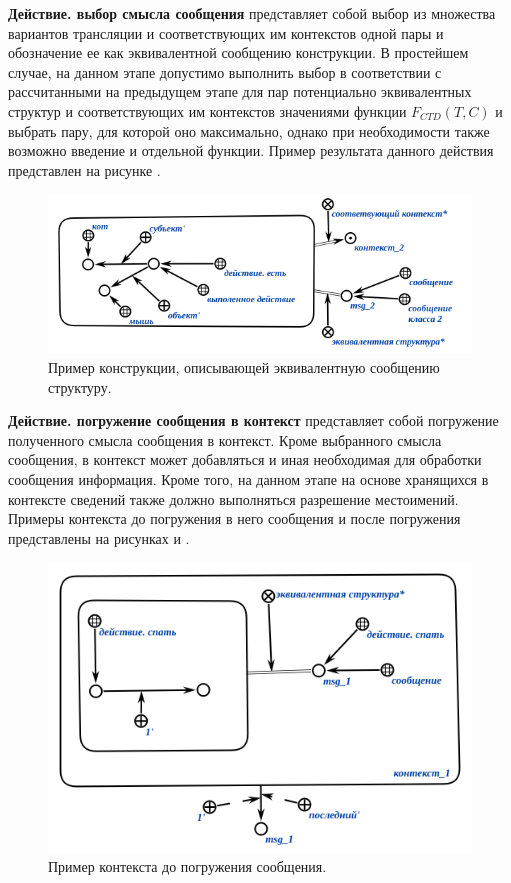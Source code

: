 {\textbf{Действие. выбор смысла сообщения} представляет собой выбор из множества вариантов трансляции и соответствующих им контекстов одной пары и обозначение ее как эквивалентной сообщению конструкции.
В простейшем случае, на данном этапе допустимо выполнить выбор в соответствии с рассчитанными на предыдущем этапе для пар потенциально эквивалентных структур и соответствующих им контекстов значениями функции $F_{CTD}(T, C)$ и выбрать пару, для которой оно максимально, однако при необходимости также возможно введение и отдельной функции.
Пример результата данного действия представлен на рисунке \textit{}.

\begin{figure}[h]
    \centering
    \includegraphics[scale=0.8]{images/part4/chapter_nl_interfaces/message_equivalent_structure}
    \caption{Пример конструкции, описывающей эквивалентную сообщению структуру.}
    \label{fig:message_equivalent_structure}
\end{figure}

\textbf{Действие. погружение сообщения в контекст} представляет собой погружение полученного смысла сообщения в контекст.
Кроме выбранного смысла сообщения, в контекст может добавляться и иная необходимая для обработки сообщения информация.
Кроме того, на данном этапе на основе хранящихся в контексте сведений также должно выполняться разрешение местоимений.
Примеры контекста до погружения в него сообщения и после погружения представлены на рисунках \textit{} и \textit{}.

\begin{figure}[h]
    \centering
    \includegraphics[scale=0.8]{images/part4/chapter_nl_interfaces/context_1}
    \caption{Пример контекста до погружения сообщения.}
    \label{fig:context_before_update}
\end{figure}

}
